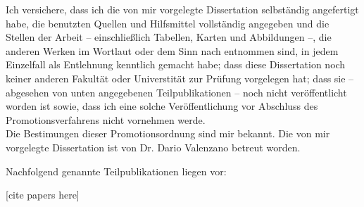
\begin{declaration}

Ich versichere, dass ich die von mir vorgelegte Dissertation selbst\"andig angefertigt habe, die benutzten Quellen und Hilfsmittel vollst\"andig angegeben und die Stellen der Arbeit -- einschlie{\ss}lich Tabellen, Karten und Abbildungen --, die anderen Werken im Wortlaut oder dem Sinn nach entnommen sind, in jedem Einzelfall als Entlehnung kenntlich gemacht habe; dass diese Dissertation noch keiner anderen Fakult\"at oder Universtit\"at zur Pr\"ufung vorgelegen hat; dass sie -- abgesehen von unten angegebenen Teilpublikationen -- noch nicht ver\"offentlicht worden ist sowie, dass ich eine solche Ver\"offentlichung vor Abschluss des Promotionsverfahrens nicht vornehmen werde.\\

Die Bestimungen dieser Promotionsordnung sind mir bekannt. Die von mir vorgelegte Dissertation ist von Dr. Dario Valenzano betreut worden.

Nachfolgend genannte Teilpublikationen liegen vor:

[cite papers here]

\end{declaration}

